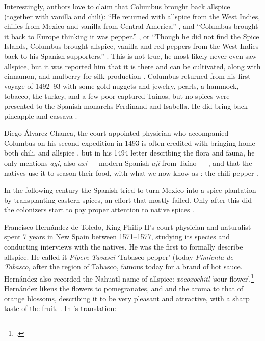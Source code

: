 Interestingly, authors love to claim that Columbus brought back allspice (together with vanilla and chili): ``He returned with allspice from the West Indies, chilies from Mexico and vanilla from Central America.'' \autocite[17]{craze_spice_1997}, and ``Columbus brought it back to Europe thinking it was pepper.'' \autocite[146]{czarra_spices_2009}, or ``Though he did not find the Spice Islands, Columbus brought allspice, vanilla and red peppers from the West Indies back to his Spanish supporters.'' \autocite[1]{parthasarathy_chemistry_2008}. This is not true, he most likely never even saw allspice, but it was reported him that it is there and can be cultivated, along with cinnamon, and mulberry for silk production \autocites[151]{colon_life_1959}. Columbus returned from his first voyage of 1492--93 with some gold nuggets and jewelry, pearls, a hammock, tobacco, the turkey, and a few poor captured Taínos, but no spices were presented to the Spanish monarchs Ferdinand and Isabella. He did bring back pineapple and cassava \autocite[11]{turner_spice_2004}. 

Diego Álvarez Chanca, the court appointed physician who accompanied Columbus on his second expedition in 1493 is often credited with bringing home both chili, and allspice \autocites[]{mccormick_history_nodate}, but in his 1494 letter describing the flora and fauna, he only mentions \textit{agi}, also \textit{axi} --- modern Spanish \textit{ají} from Taíno --- \autocite[see][34]{corominas_breve_1987}, and that the natives use it to season their food, with what we now know as : the chili pepper \autocite[311]{chanca_american_2003}.

In the following century the Spanish tried to turn Mexico into a spice plantation by transplanting eastern spices, an effort that mostly failed. Only after this did the colonizers start to pay proper attention to native spices \autocite[6]{machuca_past_2020}. 

Francisco Hernández de Toledo, King Philip II's court physician and naturalist spent 7 years in New Spain between 1571--1577, studying its species and conducting interviews with the natives. He was the first to formally describe allspice. He called it \textit{Pipere Tavasci} `Tabasco pepper' (today \textit{Pimienta de Tabasco}, after the region of Tabasco, famous today for a brand of hot sauce. Hernández also recorded the Nahuatl name of allspice: \textit{xocoxochitl} `sour flower'.\footcite[cf.][s.v. xococ; xochitl]{ond} Hernández likens the flowers to pomegranates, and and the aroma to that of orange blossoms, describing it to be very pleasant and attractive, with a sharp taste of the fruit. \autocite[2]{hernandez_cuatro_1615}. In \textcite{machuca_past_2020}'s translation:

